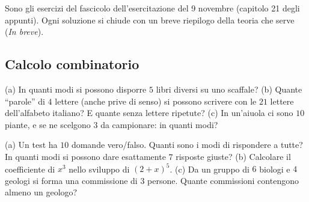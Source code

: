 Sono gli esercizi del fascicolo dell'esercitazione del 9 novembre (capitolo 21 degli appunti). Ogni soluzione si chiude con un breve riepilogo della teoria che serve (\emph{In breve}).

\subsection*{Calcolo combinatorio}
\begin{esercizio}[\liv{1}]
(a) In quanti modi si possono disporre $5$ libri diversi su uno scaffale? (b) Quante ``parole'' di $4$ lettere (anche prive di senso) si possono scrivere con le $21$ lettere dell'alfabeto italiano? E quante senza lettere ripetute? (c) In un'aiuola ci sono $10$ piante, e se ne scelgono $3$ da campionare: in quanti modi?
\end{esercizio}

\begin{esercizio}[\liv{2}]
(a) Un test ha $10$ domande vero/falso. Quanti sono i modi di rispondere a tutte? In quanti modi si possono dare esattamente $7$ risposte giuste? (b) Calcolare il coefficiente di $x^3$ nello sviluppo di $(2+x)^5$. (c) Da un gruppo di $6$ biologi e $4$ geologi si forma una commissione di $3$ persone. Quante commissioni contengono almeno un geologo?
\end{esercizio}


